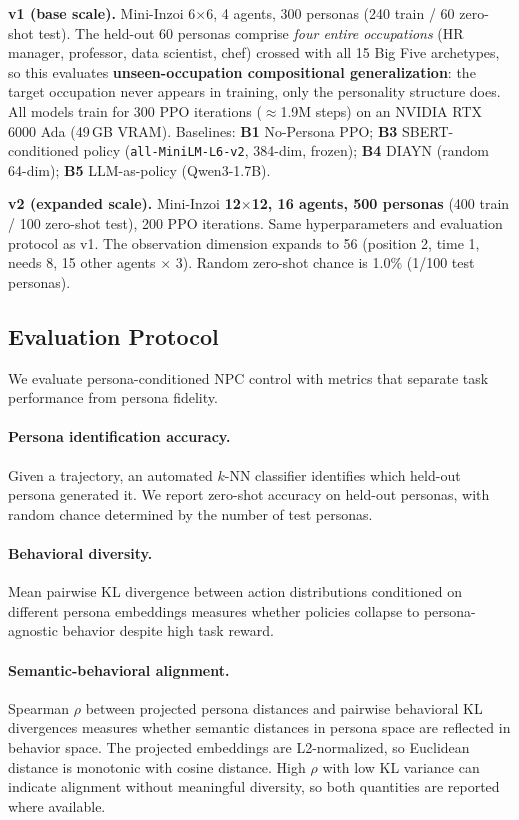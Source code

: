 \documentclass[conference]{IEEEtran}
\begin{document}
\textbf{v1 (base scale).}
Mini-Inzoi 6$\times$6, 4 agents, 300 personas (240 train / 60 zero-shot test).
The held-out 60 personas comprise \emph{four entire occupations} (HR manager,
professor, data scientist, chef) crossed with all 15 Big Five archetypes, so
this evaluates \textbf{unseen-occupation compositional generalization}: the
target occupation never appears in training, only the personality structure
does.
All models train for 300 PPO iterations ($\approx$1.9M steps) on an NVIDIA
RTX 6000 Ada (49\,GB VRAM).
Baselines: \textbf{B1} No-Persona PPO; \textbf{B3} SBERT-conditioned policy
(\texttt{all-MiniLM-L6-v2}, 384-dim, frozen); \textbf{B4} DIAYN (random 64-dim);
\textbf{B5} LLM-as-policy (Qwen3-1.7B).

\textbf{v2 (expanded scale).}
Mini-Inzoi \textbf{12$\times$12, 16 agents, 500 personas} (400 train / 100
zero-shot test), 200 PPO iterations.
Same hyperparameters and evaluation protocol as v1.
The observation dimension expands to 56 (position 2, time 1, needs 8,
15 other agents $\times$ 3).
Random zero-shot chance is 1.0\% (1/100 test personas).

\subsection{Evaluation Protocol}
\label{sec:evalprotocol}

We evaluate persona-conditioned NPC control with metrics that separate task
performance from persona fidelity.

\paragraph{Persona identification accuracy.}
Given a trajectory, an automated $k$-NN classifier identifies which held-out
persona generated it. We report zero-shot accuracy on held-out personas, with
random chance determined by the number of test personas.

\paragraph{Behavioral diversity.}
Mean pairwise KL divergence between action distributions conditioned on different
persona embeddings measures whether policies collapse to persona-agnostic
behavior despite high task reward.

\paragraph{Semantic-behavioral alignment.}
Spearman $\rho$ between projected persona distances and pairwise behavioral KL
divergences measures whether semantic distances in persona space are reflected
in behavior space. The projected embeddings are L2-normalized, so Euclidean
distance is monotonic with cosine distance. High $\rho$ with low KL variance can
indicate alignment without meaningful diversity, so both quantities are reported
where available.
\end{document}

